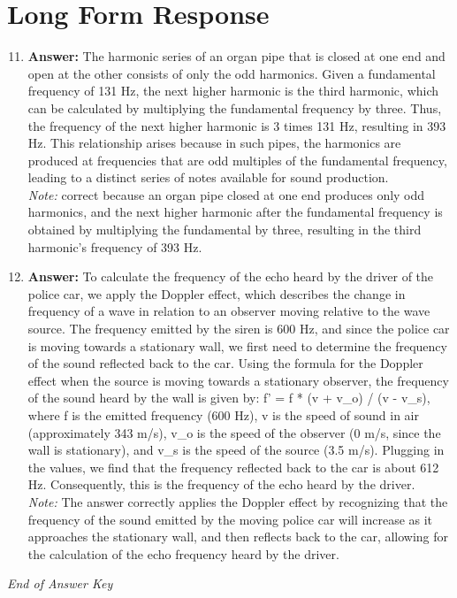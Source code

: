 \documentclass[12pt]{article}
\begin{document}
\section*{Long Form Response}
\begin{enumerate}[label=\arabic*.]
\setcounter{enumi}{10}
\item \textbf{Answer:} The harmonic series of an organ pipe that is closed at one end and open at the other consists of only the odd harmonics. Given a fundamental frequency of 131 Hz, the next higher harmonic is the third harmonic, which can be calculated by multiplying the fundamental frequency by three. Thus, the frequency of the next higher harmonic is 3 times 131 Hz, resulting in 393 Hz. This relationship arises because in such pipes, the harmonics are produced at frequencies that are odd multiples of the fundamental frequency, leading to a distinct series of notes available for sound production.
\\ \textit{Note:} correct because an organ pipe closed at one end produces only odd harmonics, and the next higher harmonic after the fundamental frequency is obtained by multiplying the fundamental by three, resulting in the third harmonic's frequency of 393 Hz.
\item \textbf{Answer:} To calculate the frequency of the echo heard by the driver of the police car, we apply the Doppler effect, which describes the change in frequency of a wave in relation to an observer moving relative to the wave source. The frequency emitted by the siren is 600 Hz, and since the police car is moving towards a stationary wall, we first need to determine the frequency of the sound reflected back to the car. Using the formula for the Doppler effect when the source is moving towards a stationary observer, the frequency of the sound heard by the wall is given by: f' = f * (v + v\_o) / (v - v\_s), where f is the emitted frequency (600 Hz), v is the speed of sound in air (approximately 343 m/s), v\_o is the speed of the observer (0 m/s, since the wall is stationary), and v\_s is the speed of the source (3.5 m/s). Plugging in the values, we find that the frequency reflected back to the car is about 612 Hz. Consequently, this is the frequency of the echo heard by the driver.
\\ \textit{Note:} The answer correctly applies the Doppler effect by recognizing that the frequency of the sound emitted by the moving police car will increase as it approaches the stationary wall, and then reflects back to the car, allowing for the calculation of the echo frequency heard by the driver.
\end{enumerate}

\vfill
\noindent\textit{End of Answer Key}
\end{document}
